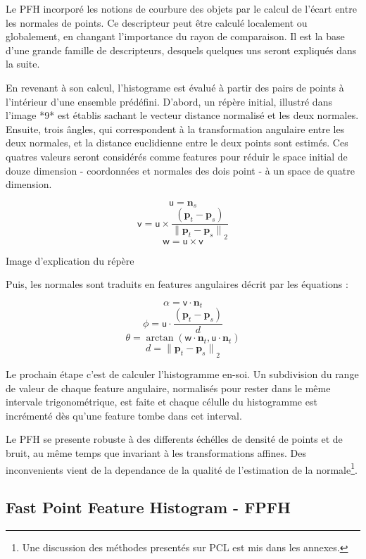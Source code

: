 Le PFH incorporé les notions de courbure des objets par le calcul de
l'écart entre les normales de points. Ce descripteur peut être calculé
localement ou globalement, en changant l'importance du rayon de
comparaison. Il est la base d'une grande famille de descripteurs, desquels
 quelques uns seront expliqués dans la suite.

En revenant à son calcul, l'histograme est évalué à partir des pairs
de points à l'intérieur d'une ensemble prédéfini. D'abord, un répère
initial, illustré dans l'image *9* est établis sachant le vecteur distance normalisé et les deux
normales. Ensuite, trois ângles, qui correspondent à la transformation
angulaire entre les deux normales, et la distance euclidienne entre le
deux points sont estimés. Ces quatres valeurs seront considérés comme
features pour réduir le space initial de douze dimension - coordonnées
et normales des dois point - à un space de quatre dimension.

$$  {\mathsf u} = \boldsymbol{n}_s $$ 
$$  {\mathsf v} =  {\mathsf u} \times \frac{(\boldsymbol{p}_t-\boldsymbol{p}_s)}{{\|\boldsymbol{p}_t-\boldsymbol{p}_s\|}_{2}} $$
$$  {\mathsf w} = {\mathsf u} \times {\mathsf v}$$

{\color{blue} Image d'explication du répère}

Puis, les normales sont traduits en features angulaires décrit par les équations :

$$  \alpha = {\mathsf v} \cdot \boldsymbol{n}_t $$
$$  \phi   = {\mathsf u} \cdot \frac{(\boldsymbol{p}_t - \boldsymbol{p}_s)}{d} $$
$$  \theta = \arctan ({\mathsf w} \cdot \boldsymbol{n}_t, {\mathsf u} \cdot \boldsymbol{n}_t)$$
$$ d={\|\boldsymbol{p}_t-\boldsymbol{p}_s\|}_2 $$

Le prochain étape c'est de calculer l'histogramme en-soi. Un
subdivision du range de valeur de chaque feature angulaire, 
normalisés pour rester dans le même intervale trigonométrique,
est faite et chaque célulle du histogramme est incrémenté dès
qu'une feature tombe dans cet interval. 

Le PFH se presente robuste à des differents échélles de densité de points et de bruit, au même temps que invariant à les transformations affines. Des inconvenients vient de la dependance de la qualité de l'estimation de la normale\footnote{ Une discussion des méthodes presentés sur PCL est mis dans les annexes.}.

\subsection{Fast Point Feature Histogram - FPFH}

